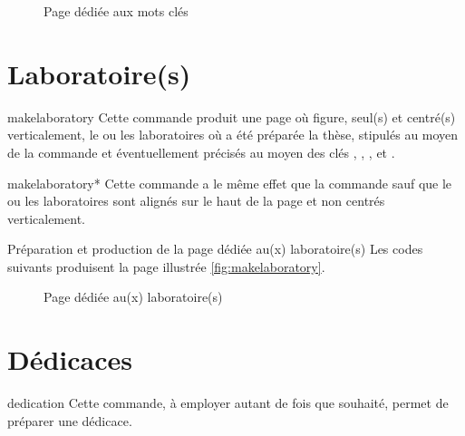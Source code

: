 \begin{figure}[htbp]
  \centering {}%
  \caption{Page dédiée aux mots clés}
  \label{fig:makekeywords}
\end{figure}

\section{Laboratoire(s)}
\label{sec:laboratoires}

\begin{docCommand}{makelaboratory}{}
  Cette commande produit une page où figure, seul(s) et centré(s)
  verticalement, le ou les laboratoires où a été préparée la thèse, stipulés au
  moyen de la commande  et éventuellement précisés au moyen
  des clés , , , 
  et .
\end{docCommand}
%
\begin{docCommand}{makelaboratory*}{}
  Cette commande a le même effet que la commande  sauf
  que le ou les laboratoires sont alignés sur le haut de la page et non centrés
  verticalement.
\end{docCommand}

\begin{dbexample}{Préparation et production de la page dédiée au(x) laboratoire(s)}{}
  Les codes suivants produisent la page illustrée \vref{fig:makelaboratory}.
  \NoAutoSpacing%
%
\end{dbexample}

\begin{figure}[htbp]
  \centering {}
  \caption{Page dédiée au(x) laboratoire(s)}
  \label{fig:makelaboratory}
\end{figure}

\section{Dédicaces}

\begin{docCommand}{dedication}{}
  Cette commande, à employer autant de fois que
  souhaité\hauteurpage{}, permet de préparer une dédicace.
\end{docCommand}

